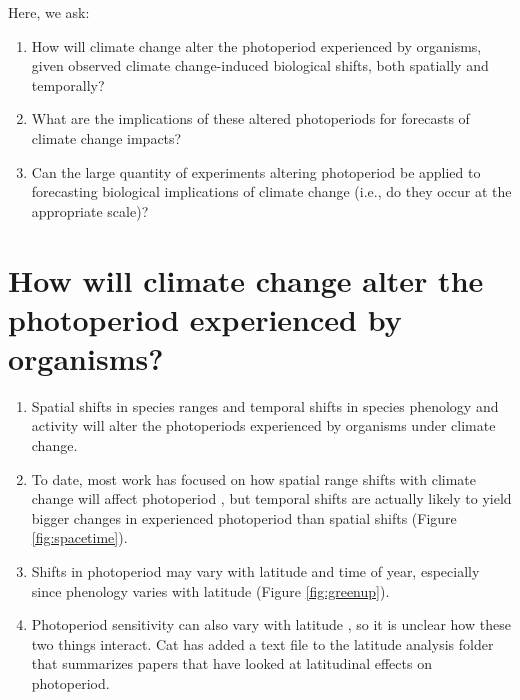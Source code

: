 \documentclass{article}
\begin{document}
Here, we ask: 
\begin{enumerate}
\item How will climate change alter the photoperiod experienced by organisms, given observed climate change-induced biological shifts, both spatially and temporally?
\item What are the implications of these altered photoperiods for forecasts of climate change impacts?
\item Can the large quantity of experiments altering photoperiod be applied to forecasting biological implications of climate change (i.e., do they occur at the appropriate scale)?
\end{enumerate}

\section*{How will climate change alter the photoperiod experienced by organisms?}
\begin{enumerate}
\item Spatial shifts in species ranges and temporal shifts in species phenology and activity will alter the photoperiods experienced by organisms under climate change.
\item  To date, most work has focused on how spatial range shifts with climate change will affect photoperiod \citep{saikkonen2012}, but temporal shifts are actually likely to yield bigger changes in experienced photoperiod than spatial shifts (Figure \ref{fig:spacetime}).
\item Shifts in photoperiod may vary with latitude and time of year, especially since phenology varies with latitude (Figure \ref{fig:greenup}).
\item Photoperiod sensitivity can also vary with latitude \citep{Howe:1996,saikkonen2012,Partanen:2005aa,Vihera-Aarnio:2006aa,Caffarra:2011b,gauzere2017}, so it is unclear how these two things interact. Cat has added a text file to the latitude analysis folder that summarizes papers that have looked at latitudinal effects on photoperiod.
\end{enumerate}
\end{document}

